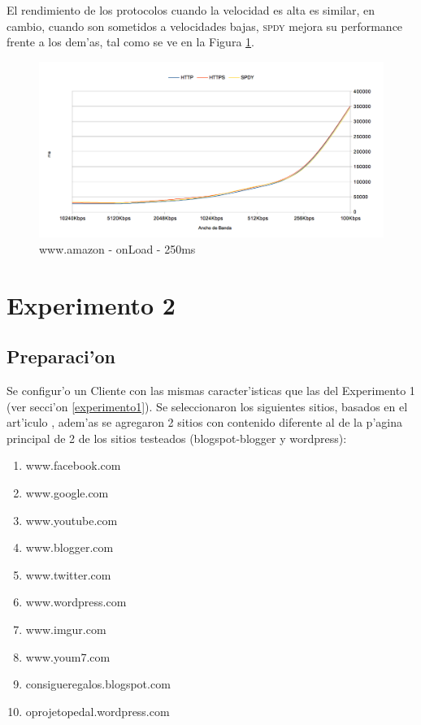 \documentclass[a4paper,11pt,twocolumn]{article}
\begin{document}
El rendimiento de los protocolos cuando la velocidad es alta es similar, en cambio, cuando son sometidos a velocidades bajas, \textsc{spdy} mejora su performance frente a los dem'as, tal como se ve en la Figura \ref{graf6}.

\begin{figure}[ht]
  	\centering
	\includegraphics[scale=0.65]{exp1_6}
	\caption{\small www.amazon - onLoad - 250ms}
	\label{graf6}
\end{figure}

\section{Experimento 2}
\label{experimento2}
\subsection{Preparaci'on}

Se configur'o un Cliente con las mismas caracter'isticas que las del Experimento 1 (ver secci'on \ref{experimento1}). Se seleccionaron los siguientes sitios, basados en el art'iculo \cite{effectSPDY}, adem'as se agregaron 2 sitios con contenido diferente al de la p'agina principal de 2 de los sitios testeados (blogspot-blogger y wordpress):
\begin{enumerate}
\item www.facebook.com
\item www.google.com
\item www.youtube.com
\item www.blogger.com
\item www.twitter.com
\item www.wordpress.com
\item www.imgur.com
\item www.youm7.com
\item consigueregalos.blogspot.com
\item oprojetopedal.wordpress.com
\end{enumerate}
\end{document}
